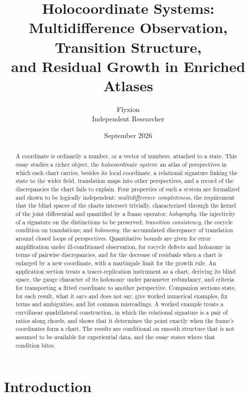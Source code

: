 \documentclass[11pt]{article}
\title{Holocoordinate Systems:\\ Multidifference Observation, Transition Structure,\\ and Residual Growth in Enriched Atlases}
\author{Flyxion\\ \small Independent Researcher}
\date{September 2026}
\theoremstyle{remark}
\begin{document}
\maketitle

\begin{abstract}
\noindent A coordinate is ordinarily a number, or a vector of numbers, attached to a state. This essay studies a richer object, the \emph{holocoordinate system}: an atlas of perspectives in which each chart carries, besides its local coordinate, a relational signature linking the state to the wider field, translation maps into other perspectives, and a record of the discrepancies the chart fails to explain. Four properties of such a system are formalized and shown to be logically independent: \emph{multidifference completeness}, the requirement that the blind spaces of the charts intersect trivially, characterized through the kernel of the joint differential and quantified by a frame operator; \emph{holography}, the injectivity of a signature on the distinctions to be preserved; \emph{transition consistency}, the cocycle condition on translations; and \emph{holonomy}, the accumulated discrepancy of translation around closed loops of perspectives. Quantitative bounds are given for error amplification under ill-conditioned observation, for cocycle defects and holonomy in terms of pairwise discrepancies, and for the decrease of residuals when a chart is enlarged by a new coordinate, with a martingale limit for the growth rule. An application section treats a tracer-replication instrument as a chart, deriving its blind space, the gauge character of its holonomy under parameter redundancy, and criteria for transporting a fitted coordinate to another perspective. Companion sections state, for each result, what it says and does not say, give worked numerical examples, fix terms and ambiguities, and list common misreadings. A worked example treats a curvilinear quadrilateral construction, in which the relational signature is a pair of ratios along chords, and shows that it determines the point exactly when the frame's coordinates form a chart. The results are conditional on smooth structure that is not assumed to be available for experiential data, and the essay states where that condition bites.
\end{abstract}

\newpage

\section{Introduction}
\end{document}
